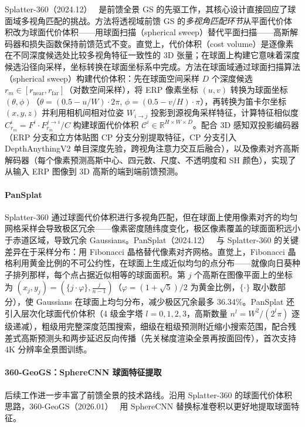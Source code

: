 Splatter-360（2024.12）~\cite{2412_06250} 是前馈全景 GS 的先驱工作，其核心设计直接回应了球面域多视角匹配的挑战。方法将透视域前馈 GS 的\emph{多视角匹配环节}从平面代价体积改为球面代价体积——用球面扫描（spherical sweep）替代平面扫描——高斯解码器和损失函数保持前馈范式不变。直觉上，代价体积（cost volume）是逐像素在不同深度候选处比较多视角特征一致性的 3D 张量；在球面上构建它意味着深度候选沿径向采样，坐标转换在球面坐标系中完成。方法在球面域通过球面扫描算法（spherical sweep）构建代价体积：先在球面空间采样 $D$ 个深度候选 $r_m \in [r_{\text{near}}, r_{\text{far}}]$（对数空间采样），将 ERP 像素坐标 $(u,v)$ 转换为球面坐标 $(\theta, \phi)$（$\theta = (0.5-u/W) \cdot 2\pi$, $\phi = (0.5-v/H) \cdot \pi$），再转换为笛卡尔坐标 $(x,y,z)$ 并利用相机间相对位姿 $W_{i \to j}$ 投影到源视角采样特征，计算特征相似度 $C_{r_m}^i = F^i \cdot F^{j \to i}_{r_m} / C$ 构建球面代价体积 $\mathcal{C}^i \in \mathbb{R}^{H \times W \times D}$。配合 3D 感知双投影编码器（ERP 分支和立方体贴图 CP 分支分别提取特征，CP 分支引入 DepthAnythingV2 单目深度先验，跨视角注意力交互后融合），以及像素对齐高斯解码器（每个像素预测高斯中心、四元数、尺度、不透明度和 SH 颜色），实现了从输入 ERP 图像到 3D 高斯的端到端前馈预测。

\paragraph{PanSplat}
Splatter-360 通过球面代价体积进行多视角匹配，但在球面上使用像素对齐的均匀网格采样会导致极区冗余——像素密度随纬度变化，极区像素覆盖的球面面积远小于赤道区域，导致冗余 Gaussians。PanSplat（2024.12）~\cite{2412_12096} 与 Splatter-360 的关键差异在于采样分布：用 Fibonacci 晶格替代像素对齐网格。直觉上，Fibonacci 晶格利用黄金比例的不可公约性，在球面上生成近似均匀的点分布——就像向日葵种子排列那样，每个点占据近似相等的球面面积。第 $j$ 个高斯在图像平面上的坐标为 $(x_j, y_j) = (\{j \cdot \varphi\}, \frac{j}{n-1})$（$\varphi = (1+\sqrt{5})/2$ 为黄金比例，$\{\cdot\}$ 取小数部分），使 Gaussians 在球面上均匀分布，减少极区冗余最多 36.34\%。PanSplat 还引入层次化球面代价体积（4 级金字塔 $l=0,1,2,3$，高斯数量 $n^l = W^2/(2^l \pi)$ 逐级递减），粗级用完整深度范围搜索，细级在粗级预测附近缩小搜索范围，配合残差式高斯预测头和两步延迟反向传播（先关梯度渲染全景再按面回传），首次支持 4K 分辨率全景图训练。

\paragraph{360-GeoGS：SphereCNN 球面特征提取}
后续工作进一步丰富了前馈全景的技术路线。沿用 Splatter-360 的球面代价体积思路，360-GeoGS（2026.01）~\cite{2601_02102} 用 SphereCNN 替换标准卷积以更好地提取球面特征。


